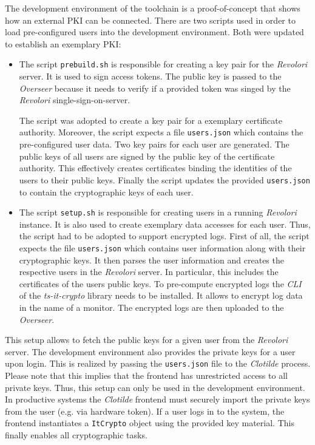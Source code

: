 \documentclass[../main.tex]{subfiles}
\begin{document}
The development environment of the toolchain is a proof-of-concept that shows how an external PKI can be connected.
There are two scripts used in order to load pre-configured users into the development environment.
Both were updated to establish an exemplary PKI:

\begin{itemize}
    \item 
    The script \verb|prebuild.sh| is responsible for creating a key pair for the \emph{Revolori} server.
    It is used to sign access tokens.
    The public key is passed to the \emph{Overseer} because it needs to verify if a provided token was singed by the \emph{Revolori} single-sign-on-server.
    
    The script was adopted to create a key pair for a exemplary certificate authority.
    Moreover, the script expects a file \verb|users.json| which contains the pre-configured user data.
    Two key pairs for each user are generated.
    The public keys of all users are signed by the public key of the certificate authority.
    This effectively creates certificates binding the identities of the users to their public keys.
    Finally the script updates the provided \verb|users.json| to contain the cryptographic keys of each user.
    \item 
    The script \verb|setup.sh| is responsible for creating users in a running \emph{Revolori} instance.
    It is also used to create exemplary data accesses for each user.
    Thus, the script had to be adopted to support encrypted logs.
    First of all, the script expects the file \verb|users.json| which contains user information along with their cryptographic keys.
    It then parses the user information and creates the respective users in the \emph{Revolori} server.
    In particular, this includes the certificates of the users public keys.
    To pre-compute encrypted logs the \emph{CLI} of the \emph{ts-it-crypto} library needs to be installed.
    It allows to encrypt log data in the name of a monitor.
    The encrypted logs are then uploaded to the \emph{Overseer}.

\end{itemize}

This setup allows to fetch the public keys for a given user from the \emph{Revolori} server.
The development environment also provides the private keys for a user upon login.
This is realized by passing the \verb|users.json| file to the \emph{Clotilde} process.
Please note that this implies that the frontend has unrestricted access to all private keys.
Thus, this setup can only be used in the development environment.
In productive systems the \emph{Clotilde} frontend must securely import the private keys from the user (e.g. via hardware token).
If a user logs in to the system, the frontend instantiates a \verb|ItCrypto| object using the provided key material.
This finally enables all cryptographic tasks.
\end{document}
